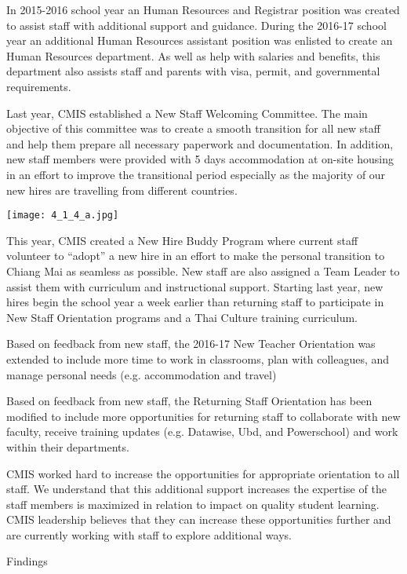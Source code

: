 \begin{findings}
In 2015-2016 school year an Human Resources and Registrar position was created to assist staff with additional support and guidance. During the 2016-17 school year an additional Human Resources assistant position was enlisted to create an Human Resources department. As well as help with salaries and benefits, this department also assists staff and parents with visa, permit, and governmental requirements.

Last year, CMIS established a New Staff Welcoming Committee. The main objective of this committee  was to create a smooth transition for all new staff and help them prepare all necessary paperwork and documentation. In addition, new staff members were provided with 5 days accommodation at on-site housing in an effort to improve the transitional period especially as the majority of our new hires are travelling from different countries.

\texttt{[image: 4\_1\_4\_a.jpg]}

This year, CMIS created a New Hire Buddy Program where current staff volunteer to “adopt” a new hire in an effort to make the personal transition to Chiang Mai as seamless as possible. New staff  are also assigned a Team Leader to assist them with curriculum and instructional support. Starting last year, new hires begin the school year a week earlier than returning staff to participate in New Staff Orientation programs and a Thai Culture training curriculum.

Based on feedback from new staff, the 2016-17 New Teacher Orientation was extended to include more time to work in classrooms, plan with colleagues, and manage personal needs (e.g. accommodation and travel)

Based on feedback from new staff, the Returning Staff Orientation has been modified to include  more opportunities for returning staff to collaborate with new faculty, receive training updates (e.g. Datawise, Ubd, and Powerschool) and work within their departments.


CMIS worked hard to increase the opportunities for appropriate orientation to all staff. We understand that this additional support increases the expertise of the staff members is maximized in relation to impact on quality student learning. CMIS leadership believes that they can increase these opportunities further and are currently working with staff to explore additional ways.
\end{findings}Findings

